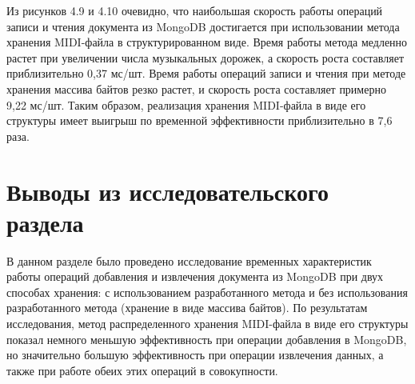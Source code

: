 Из рисунков 4.9 и 4.10 очевидно, что наибольшая скорость работы операций записи и чтения документа из MongoDB достигается при использовании метода хранения MIDI-файла в структурированном виде. Время работы метода медленно растет при увеличении числа музыкальных дорожек, а скорость роста составляет приблизительно 0,37 мс/шт. Время работы операций записи и чтения при методе хранения массива байтов резко растет, и скорость роста составляет примерно 9,22 мс/шт. Таким образом, реализация хранения MIDI-файла в виде его структуры имеет выигрыш по временной эффективности приблизительно в 7,6 раза. 

\section{Выводы из исследовательского раздела}

В данном разделе было проведено исследование временных характеристик работы операций добавления и извлечения документа из MongoDB при двух способах хранения: с использованием разработанного метода и без использования разработанного метода (хранение в виде массива байтов). По результатам исследования, метод распределенного хранения MIDI-файла в виде его структуры показал немного меньшую эффективность при операции добавления в MongoDB, но значительно большую эффективность при операции извлечения данных, а также при работе обеих этих операций в совокупности. 

